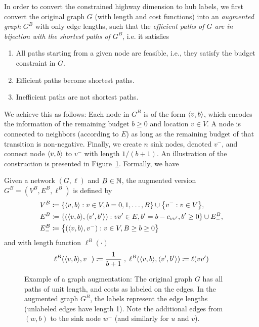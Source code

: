\label{sec:augmented}
In order to convert the constrained highway dimension to hub labels, we first convert the original graph $G$ (with length and cost functions) into an \emph{augmented graph} $G^B$ with only edge lengths, such that the \emph{efficient paths of $G$ are in bijection with the shortest paths of $G^B$}, i.e. it satisfies
\begin{enumerate}[nosep]
\item All paths starting from a given node are feasible, i.e., they satisfy the budget constraint in $G$.
\item Efficient paths become shortest paths.
\item Inefficient paths are not shortest paths.
\end{enumerate}
We achieve this as follows: Each node in $G^B$ is of the form $\langle v,b\rangle$, which encodes the information of the remaining budget $b\geq 0$ and location $v\in V$.
A node is connected to neighbors (according to $E$) as long as the remaining budget of that transition is non-negative.
Finally, we create $n$ sink nodes, denoted $v^-$, and connect node $\langle v,b\rangle$ to $v^-$ with length $1/(b+1)$.
An illustration of the construction is presented in Figure~\ref{fig:augmented}.
Formally, we have
\begin{definition}
Given a network $(G,\ell)$ and $B\in\mathbb{N}$, the augmented version $G^B=(V^B,E^B,\ell^B)$ is defined by
\begin{align*}
V^B &\defeq\crl*{\pp{v,b}: v\in V, b=0,1,\ldots,B}\cup\crl*{v^-:v\in V},\\
E^B &\defeq\crl*{(\pp{v,b},\pp{v',b'}) : vv'\in E, b'=b-c_{vv'}, b'\geq 0}\cup E^{B}_{-},\\
E^{B}_{-} &\defeq \crl*{(\pp{v,b},v^-): v\in V, B\geq b\geq 0}
\end{align*}
and with length function $\ell^B(\cdot)$
\begin{align*}
\ell^B(\langle v,b\rangle,v^-) \coloneqq \frac{1}{b+1}\;,\;
\ell^B(\langle v,b\rangle,\langle v',b'\rangle) \coloneqq \ell(vv')
\end{align*}
\end{definition}



\begin{figure}

\caption{Example of a graph augmentation: The original graph $G$ has all paths of unit length, and costs as labeled on the edges. In the augmented graph $G^B$, the labels represent the edge lengths (unlabeled edges have length 1). Note the additional edges from $(w,b)$ to the sink node $w^-$ (and similarly for $u$ and $v$). 
}
\label{fig:augmented}
\end{figure}


